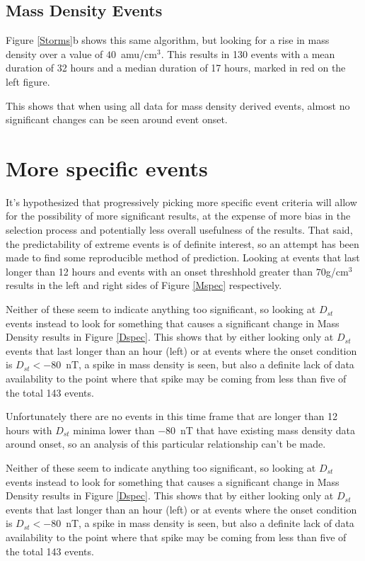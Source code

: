 \documentclass[10pt,twocolumn]{article}
\begin{document}
\subsection{Mass Density Events}
Figure \ref{Storms}b shows this same algorithm, but looking for a rise in mass density over a value of $40$~amu/cm$^3$. This results in 130 events with a mean duration of 32 hours and a median duration of 17 hours, marked in red on the left figure.

This shows that when using all data for mass density derived events, almost no significant changes can be seen around event onset.

\section{More specific events}
It's hypothesized that progressively picking more specific event criteria will allow for the possibility of more significant results, at the expense of more bias in the selection process and potentially less overall usefulness of the results. That said, the predictability of extreme events is of definite interest, so an attempt has been made to find some reproducible method of prediction. Looking at events that last longer than 12 hours and events with an onset threshhold greater than $70$g/cm$^3$ results in the left and right sides of Figure \ref{Mspec} respectively.

Neither of these seem to indicate anything too significant, so looking at $D_{st}$ events instead to look for something that causes a significant change in Mass Density results in Figure \ref{Dspec}. This shows that by either looking only at $D_{st}$ events that last longer than an hour (left) or at events where the onset condition is $D_{st}<-80$~nT, a spike in mass density is seen, but also a definite lack of data availability to the point where that spike may be coming from less than five of the total 143 events. 

Unfortunately there are no events in this time frame that are longer than 12 hours with $D_{st}$ minima lower than $-80$~nT that have existing mass density data around onset, so an analysis of this particular relationship can't be made.

Neither of these seem to indicate anything too significant, so looking at $D_{st}$ events instead to look for something that causes a significant change in Mass Density results in Figure \ref{Dspec}. This shows that by either looking only at $D_{st}$ events that last longer than an hour (left) or at events where the onset condition is $D_{st}<-80$~nT, a spike in mass density is seen, but also a definite lack of data availability to the point where that spike may be coming from less than five of the total 143 events. 
\end{document}

